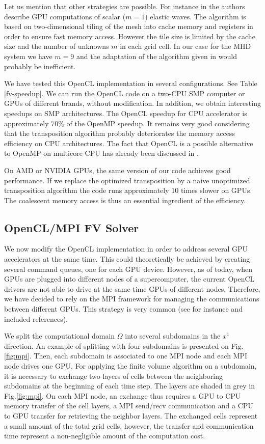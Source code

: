 \documentclass{svmult}
\begin{document}
Let us mention that other strategies are possible. For instance in
\cite{michea2010accelerating} the authors describe GPU computations of
scalar ($m=1$) elastic waves. The algorithm is based on
two-dimensional tiling of the mesh into cache memory and registers in
order to ensure fast memory access. However the tile size is limited
by the cache size and the number of unknowns $m$ in each grid cell. In
our case for the MHD system we have $m=9$ and the adaptation of the
algorithm given in \cite{michea2010accelerating} would probably be
inefficient.

We have tested this OpenCL implementation in several configurations.
See Table \ref{fv-speedup}. We can run the OpenCL code on a two-CPU
SMP computer or GPUs of different brands, without modification. In
addition, we obtain interesting speedups on SMP architectures. The
OpenCL speedup for CPU accelerator is approximately $70\%$ of the
OpenMP speedup. It remains very good considering that the
transposition algorithm probably deteriorates the memory access
efficiency on CPU architectures. The fact that OpenCL is a possible
alternative to OpenMP on multicore CPU has already been discussed in
\cite{shen2012performance}.

On AMD or NVIDIA GPUs, the same version of our code achieves good
performance. If we replace the optimized transposition by a naive
unoptimized transposition algorithm the code runs approximately 10
times slower on GPUs. The coalescent memory access is thus an
essential ingredient of the efficiency.

\subsection{OpenCL/MPI FV Solver}

We now modify the OpenCL implementation in order to address several
GPU accelerators at the same time. This could theoretically be
achieved by creating several command queues, one for each GPU
device. However, as of today, when GPUs are plugged into different
nodes of a supercomputer, the current OpenCL drivers are not able to
drive at the same time GPUs of different nodes. Therefore, we have
decided to rely on the MPI framework for managing the communications
between different GPUs. This strategy is very common (see for instance
\cite{aubert2010numerical,cabel2011multi,helluy2014two} and included
references).

We split the computational domain $\Omega$ into several subdomains in
the $x^1$ direction. An example of splitting with four subdomains is
presented on Fig.\ref{fig:mpi}.  Then, each subdomain is associated to
one MPI node and each MPI node drives one GPU. For applying the finite
volume algorithm on a subdomain, it is necessary to exchange two
layers of cells between the neighboring subdomains at the beginning of
each time step. The layers are shaded in grey in Fig.\ref{fig:mpi}. On
each MPI node, an exchange thus requires a GPU to CPU memory transfer
of the cell layers, a MPI send/recv communication and a CPU to GPU
transfer for retrieving the neighbor layers. The exchanged cells
represent a small amount of the total grid cells, however, the
transfer and communication time represent a non-negligible amount of
the computation cost.
\end{document}
